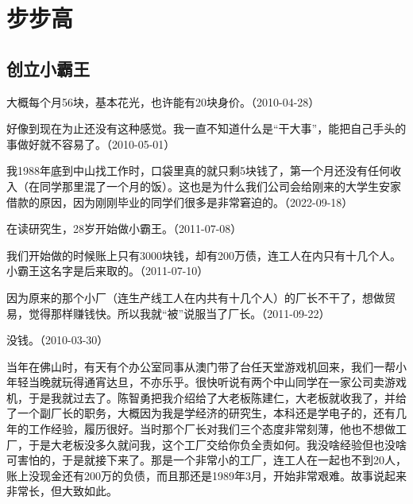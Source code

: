 
\section{步步高}


\subsection{创立小霸王}


大概每个月56块，基本花光，也许能有20块身价。（2010-04-28）


好像到现在为止还没有这种感觉。我一直不知道什么是“干大事”，能把自己手头的事做好就不容易了。（2010-05-01）

我1988年底到中山找工作时，口袋里真的就只剩5块钱了，第一个月还没有任何收入（在同学那里混了一个月的饭）。这也是为什么我们公司会给刚来的大学生安家借款的原因，因为刚刚毕业的同学们很多是非常窘迫的。（2022-09-18）


在读研究生，28岁开始做小霸王。（2011-07-08）


我们开始做的时候账上只有3000块钱，却有200万债，连工人在内只有十几个人。小霸王这名字是后来取的。（2011-07-10）


因为原来的那个小厂（连生产线工人在内共有十几个人）的厂长不干了，想做贸易，觉得那样赚钱快。所以我就“被”说服当了厂长。（2011-09-22）


没钱。（2010-03-30）


当年在佛山时，有天有个办公室同事从澳门带了台任天堂游戏机回来，我们一帮小年轻当晚就玩得通宵达旦，不亦乐乎。很快听说有两个中山同学在一家公司卖游戏机，于是我就过去了。陈智勇把我介绍给了大老板陈建仁，大老板就收我了，并给了一个副厂长的职务，大概因为我是学经济的研究生，本科还是学电子的，还有几年的工作经验，履历很好。当时那个厂长对我们三个态度非常刻薄，他也不想做工厂，于是大老板没多久就问我，这个工厂交给你负全责如何。我没啥经验但也没啥可害怕的，于是就接下来了。那是一个非常小的工厂，连工人在一起也不到20人，账上没现金还有200万的负债，而且那还是1989年3月，开始非常艰难。故事说起来非常长，但大致如此。

